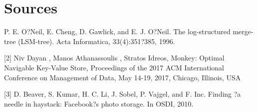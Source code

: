 \documentclass[12pt]{article}
\begin{document}
\section*{Sources}
\indent \indent [1] P. E. O?Neil, E. Cheng, D. Gawlick, and E. J. O?Neil. The
log-structured merge-tree (LSM-tree). Acta Informatica,
33(4):351?385, 1996.

[2] Niv Dayan , Manos Athanassoulis , Stratos Idreos, Monkey: Optimal Navigable Key-Value Store, Proceedings of the 2017 ACM International Conference on Management of Data, May 14-19, 2017, Chicago, Illinois, USA

[3] D. Beaver, S. Kumar, H. C. Li, J. Sobel, P. Vajgel, and F. Inc. Finding ?a needle in haystack: Facebook?s photo storage. In OSDI, 2010.
\end{document}
